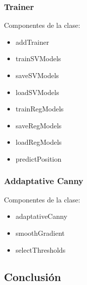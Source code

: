 \documentclass[12pt]{article} %
\begin{document}
        \subsubsection{Trainer}
        Componentes de la clase:
        \begin{itemize}
        	\item addTrainer
        	\item trainSVModels
        	\item saveSVModels
        	\item loadSVModels
        	\item trainRegModels
        	\item saveRegModels
        	\item loadRegModels
        	\item predictPosition
        \end{itemize}
        
        
        \subsubsection{Addaptative Canny}
        Componentes de la clase:
        \begin{itemize}
        	\item adaptativeCanny
        	\item smoothGradient
        	\item selectThresholds
        \end{itemize}
   
	
\subsection{Conclusión}
  
  	
\newpage


\printnoidxglossaries
{}
\end{document}
